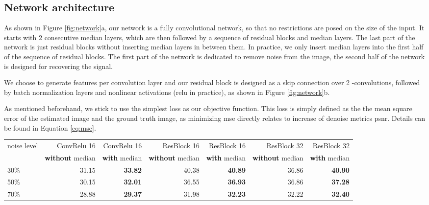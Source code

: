 \documentclass[journal]{IEEEtran}
\begin{document}
\subsection{Network architecture}

As shown in Figure \ref{fig:network}a, our network is a fully convolutional network, so that no restrictions are posed on the size of the input.
It starts with 2 consecutive median layers, which are then followed by a sequence of residual blocks and median layers. The last part of the network is just residual blocks without inserting median layers in between them. In practice, we only insert median layers into the first half of the sequence of residual blocks. The first part of the network is dedicated to remove noise from the image, the second half of the network is designed for recovering the signal.

\begin{figure*}[!ht]
  \centering
  \caption{Our network structure.
    }\label{fig:network}
\end{figure*}

We choose to generate  features per convolution layer and our residual block is designed as a skip connection over 2 -convolutions, followed by batch normalization layers and nonlinear activations (relu in practice), as shown in Figure \ref{fig:network}b.

As mentioned beforehand, we stick to use the simplest  loss as our objective function. This loss is simply defined as the the mean square error of the estimated image and the ground truth image, as minimizing mse directly relates to increase of denoise metrics psnr. Details can be found in Equation \ref{eq:mse}.

\begin{table*}
\centering
\begin{tabular}{lrrrrrr}
\toprule
noise level  & ConvRelu 16    & ConvRelu 16  & ResBlock 16    & ResBlock 16  & ResBlock 32    & ResBlock 32 \\
             &   \textbf{without} median  & \textbf{with} median &   \textbf{without} median  & \textbf{with} median &   \textbf{without} median  & \textbf{with} median \\
\midrule
30\%       & 31.15  & \textbf{33.82}    & 40.38  & \textbf{40.89}   & 36.86 & \textbf{40.90} \\
50\%       & 30.15  & \textbf{32.01}    & 36.55  & \textbf{36.93}   & 36.86 & \textbf{37.28} \\
70\%       & 28.88  & \textbf{29.37}    & 31.98  & \textbf{32.23}   & 32.22 & \textbf{32.40} \\
\bottomrule
\end{tabular}
\caption{PSNR (db) comparisons w/o Median layers on BSD300.}
\label{tab:median_effect_table}
\end{table*}
\end{document}
